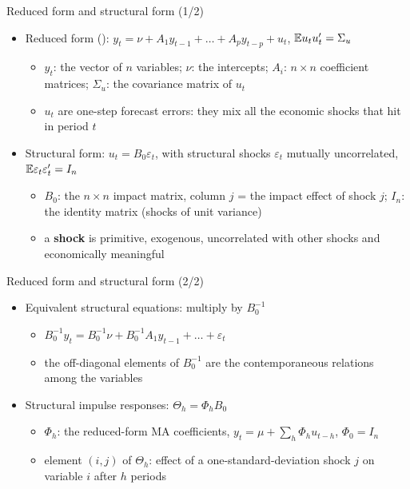\begin{frame}{Reduced form and structural form (1/2)}
\itemsize{\small}
\begin{itemize}
    \item Reduced form (): $y_t = \nu + A_1y_{t-1} + \dots + A_py_{t-p} + u_t$, $\mathbb{E} u_tu_t' = \Sigma_u$
    \begin{itemize}
        \item $y_t$: the vector of $n$ variables; $\nu$: the intercepts; $A_i$: $n \times n$ coefficient matrices; $\Sigma_u$: the covariance matrix of $u_t$
        \item $u_t$ are one-step forecast errors: they mix all the economic shocks that hit in period $t$
    \end{itemize}
    \item Structural form: $u_t = B_0\varepsilon_t$, with structural shocks $\varepsilon_t$ mutually uncorrelated, $\mathbb{E}\varepsilon_t\varepsilon_t' = I_n$
    \begin{itemize}
        \item $B_0$: the $n \times n$ impact matrix, column $j$ = the impact effect of shock $j$; $I_n$: the identity matrix (shocks of unit variance)
        \item a \textbf{shock} is primitive, exogenous, uncorrelated with other shocks and economically meaningful 
    \end{itemize}
\end{itemize}
\end{frame}

\begin{frame}{Reduced form and structural form (2/2)}
\itemsize{\small}
\begin{itemize}
    \item Equivalent structural equations: multiply by $B_0^{-1}$
    \begin{itemize}
        \item $B_0^{-1}y_t = B_0^{-1}\nu + B_0^{-1}A_1y_{t-1} + \dots + \varepsilon_t$
        \item the off-diagonal elements of $B_0^{-1}$ are the contemporaneous relations among the variables
    \end{itemize}
    \item Structural impulse responses: $\Theta_h = \Phi_hB_0$
    \begin{itemize}
        \item $\Phi_h$: the reduced-form MA coefficients, $y_t = \mu + \sum_h\Phi_hu_{t-h}$, $\Phi_0 = I_n$
        \item element $(i, j)$ of $\Theta_h$: effect of a one-standard-deviation shock $j$ on variable $i$ after $h$ periods
    \end{itemize}
\end{itemize}
\end{frame}

